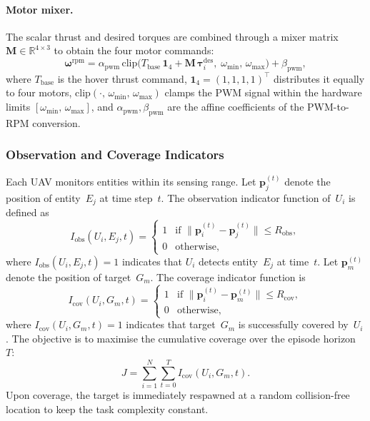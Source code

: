\paragraph{Motor mixer.}
The scalar thrust and desired torques are combined through a mixer matrix
$\mathbf{M} \in \mathbb{R}^{4\times3}$ to obtain the four motor commands:
\begin{equation}
  \boldsymbol{\omega}^{\mathrm{rpm}} =
    \alpha_{\mathrm{pwm}}\,\mathrm{clip}\!\bigl(
      T_{\mathrm{base}}\,\mathbf{1}_4
      + \mathbf{M}\,\boldsymbol{\tau}_i^{\mathrm{des}},\;
      \omega_{\min},\, \omega_{\max}
    \bigr)
    + \beta_{\mathrm{pwm}},
  \label{eq:mixer}
\end{equation}
where $T_{\mathrm{base}}$ is the hover thrust command,
$\mathbf{1}_4 = (1,1,1,1)^{\top}$ distributes it equally to four motors,
$\mathrm{clip}(\cdot,\, \omega_{\min},\, \omega_{\max})$ clamps the PWM signal
within the hardware limits $[\omega_{\min},\, \omega_{\max}]$, and
$\alpha_{\mathrm{pwm}}, \beta_{\mathrm{pwm}}$ are the affine coefficients of
the PWM-to-RPM conversion.

\subsubsection{Observation and Coverage Indicators}

Each UAV monitors entities within its sensing range.
Let $\mathbf{p}_j^{(t)}$ denote the position of entity~$E_j$ at time step~$t$.
The observation indicator function of~$U_i$ is defined as
\begin{equation}
  I_{\mathrm{obs}}(U_i, E_j, t) =
  \begin{cases}
    1 & \text{if } \lVert\mathbf{p}_i^{(t)} - \mathbf{p}_j^{(t)}\rVert
        \le R_{\mathrm{obs}}, \\
    0 & \text{otherwise},
  \end{cases}
  \label{eq:obs_indicator}
\end{equation}
where $I_{\mathrm{obs}}(U_i, E_j, t) = 1$ indicates that $U_i$ detects
entity~$E_j$ at time~$t$.
Let $\mathbf{p}_m^{(t)}$ denote the position of target~$G_m$.
The coverage indicator function is
\begin{equation}
  I_{\mathrm{cov}}(U_i, G_m, t) =
  \begin{cases}
    1 & \text{if } \lVert\mathbf{p}_i^{(t)} - \mathbf{p}_m^{(t)}\rVert
        \le R_{\mathrm{cov}}, \\
    0 & \text{otherwise},
  \end{cases}
  \label{eq:cov_indicator}
\end{equation}
where $I_{\mathrm{cov}}(U_i, G_m, t) = 1$ indicates that target~$G_m$ is
successfully covered by~$U_i$.
The objective is to maximise the cumulative coverage over the episode
horizon~$T$:
\begin{equation}
  J = \sum_{i=1}^{N}\sum_{t=0}^{T} I_{\mathrm{cov}}(U_i, G_m, t).
  \label{eq:coverage_obj}
\end{equation}
Upon coverage, the target is immediately respawned at a random collision-free
location to keep the task complexity constant.

